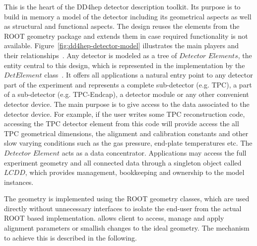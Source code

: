\documentclass[10pt,a4paper]{article}
\begin{document}
\noindent
This is the heart of the DD4hep detector description toolkit. Its purpose is 
to build in memory a model of the detector including its geometrical aspects
as well as structural and functional aspects. The design reuses the elements 
from the ROOT geometry package and extends them in case required functionality 
is not available. Figure~\ref{fig:dd4hep-detector-model} illustrates the main
players and their relationships~\cite{bib:DD4hep}.
Any detector is modeled as a tree of $Detector$ $Elements$, the entity 
central to this design, which is represented in the implementation by 
the $DetElement$ class~\cite{bib:LHCb-geometry}. It offers all
applications a natural entry point to any detector part of the experiment
and represents a complete sub-detector (e.g. TPC), a part of a 
sub-detector (e.g. TPC-Endcap), a detector module or any other convenient 
detector device. 
The main purpose is to give access to the data associated 
to the detector device. For example, if the user writes some TPC reconstruction 
code, accessing the TPC detector element from this code will provide access 
the all TPC geometrical dimensions, the alignment and calibration constants 
and other slow varying conditions such as the gas pressure, end-plate 
temperatures etc. The $Detector$ $Element$ acts as a data concentrator. 
Applications may access the full experiment geometry and all connected data
through a singleton object called $LCDD$, which provides 
management, bookkeeping and ownership to the model instances.

\noindent
The geometry is implemented using the ROOT geometry classes, which are used
directly without unnecessary interfaces to isolate the end-user from the 
actual ROOT based implementation.
\DDA allows client to access, manage and apply alignment parameters or 
smallish changes to the ideal geometry. The mechanism to achieve this 
is described in the following.
\end{document}
